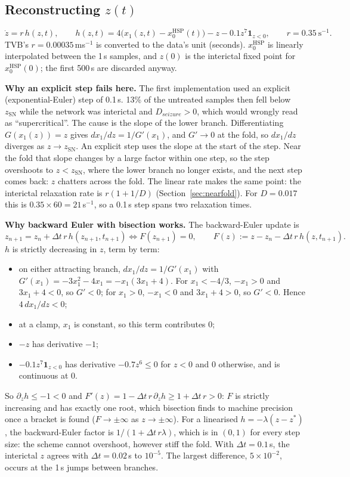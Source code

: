 \documentclass[11pt]{article}
\newcommand{\zsn}{z_{\mathrm{SN}}}
\newcommand{\xh}{x_0^{\mathrm{HSP}}}
\begin{document}
\subsection{Reconstructing $z(t)$}\label{sec:zint}
\[
\dot z = r\,h(z,t),\qquad h(z,t) = 4\big(x_1(z,t) - \xh(t)\big) - z - 0.1 z^7\mathbf 1_{z<0},\qquad r = 0.35\ \mathrm{s}^{-1}.
\]
TVB's $r=0.00035$\,ms$^{-1}$ is converted to the data's unit (seconds). $\xh$ is linearly interpolated between the 1\,s
samples, and $z(0)$ is the interictal fixed point for $\xh(0)$; the first 500\,s are discarded anyway.

\textbf{Why an explicit step fails here.} The first implementation used an explicit (exponential-Euler) step of 0.1\,s.
13\% of the untreated samples then fell below $\zsn$ while the network was interictal and $D_{seizure}>0$, which would
wrongly read as ``supercritical''. The cause is the slope of the lower branch. Differentiating $G(x_1(z)) = z$ gives
$dx_1/dz = 1/G'(x_1)$, and $G'\to0$ at the fold, so $dx_1/dz$ diverges as $z\to\zsn$. An explicit step uses the slope
at the start of the step. Near the fold that slope changes by a large factor within one step, so the step overshoots
to $z<\zsn$, where the lower branch no longer exists, and the next step comes back: $z$ chatters across the fold. The
linear rate makes the same point: the interictal relaxation rate is $r(1+1/D)$ (Section~\ref{sec:nearfold}). For
$D=0.017$ this is $0.35\times60 = 21$\,s$^{-1}$, so a 0.1\,s step spans two relaxation times.

\textbf{Why backward Euler with bisection works.} The backward-Euler update is
\[
z_{n+1} = z_n + \Delta t\,r\,h(z_{n+1}, t_{n+1}) \iff F(z_{n+1}) = 0,\qquad F(z) := z - z_n - \Delta t\,r\,h(z,t_{n+1}).
\]
$h$ is strictly decreasing in $z$, term by term:
\begin{itemize}
\item on either attracting branch, $dx_1/dz = 1/G'(x_1)$ with $G'(x_1) = -3x_1^2-4x_1 = -x_1(3x_1+4)$. For $x_1<-4/3$,
$-x_1>0$ and $3x_1+4<0$, so $G'<0$; for $x_1>0$, $-x_1<0$ and $3x_1+4>0$, so $G'<0$. Hence $4\,dx_1/dz<0$;
\item at a clamp, $x_1$ is constant, so this term contributes 0;
\item $-z$ has derivative $-1$;
\item $-0.1z^7\mathbf 1_{z<0}$ has derivative $-0.7z^6\le0$ for $z<0$ and 0 otherwise, and is continuous at 0.
\end{itemize}
So $\partial_z h \le -1 < 0$ and $F'(z) = 1 - \Delta t\,r\,\partial_z h \ge 1 + \Delta t\,r > 0$: $F$ is strictly increasing
and has exactly one root, which bisection finds to machine precision once a bracket is found ($F\to\pm\infty$ as
$z\to\pm\infty$). For a linearised $h = -\lambda(z-z^*)$, the backward-Euler factor is $1/(1+\Delta t\,r\lambda)$, which is
in $(0,1)$ for every step size: the scheme cannot overshoot, however stiff the fold. With $\Delta t=0.1$\,s, the
interictal $z$ agrees with $\Delta t=0.02$\,s to $10^{-5}$. The largest difference, $5\times10^{-2}$, occurs at the 1\,s
jumps between branches.
\end{document}

